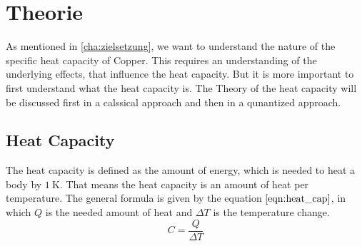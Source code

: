 \chapter{Theorie}
\label{cha:Theorie}
As mentioned in \autoref{cha:zielsetzung}, we want to understand the nature of the specific heat capacity of Copper. This requires an understanding of the underlying effects, that
influence the heat capacity. But it is more important to first understand what the heat capacity is. The Theory of the heat capacity will be discussed first in a calssical approach
and then in a qunantized approach. %
\section{Heat Capacity}
\label{sec:heat_capacity}
The heat capacity is defined as the amount of energy, which is needed to heat a body by $\qty{1}{\kelvin}$. That means the heat capacity is an amount of heat per temperature. The 
general formula is given by the equation $\ref{eqn:heat_cap}$, in which $Q$ is the needed amount of heat and $\Delta T$ is the temperature change.
\begin{equation}
    C = \frac{Q}{\Delta T}
\end{equation} 